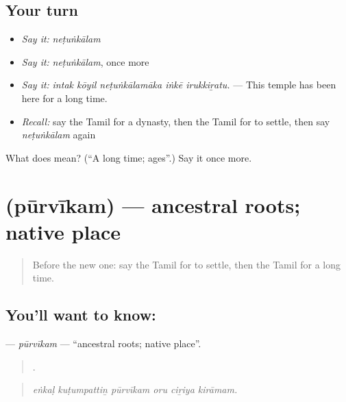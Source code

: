 \subsection*{Your turn}
\begin{itemize}
\raggedright
  \item \emph{Say it:} \emph{neṭuṅkālam}
  \item \emph{Say it:} \emph{neṭuṅkālam}, once more
  \item \emph{Say it:} \emph{intak kōyil neṭuṅkālamāka iṅkē irukkiṟatu.} — This temple has been here for a long time.
  \item \emph{Recall:} say the Tamil for a dynasty, then the Tamil for to settle, then say \emph{neṭuṅkālam} again
\end{itemize}

\begin{tcolorbox}[breakable,colback=teal!4,colframe=teal!35!black,title={Before you move on}]
What does  mean? (\textquotedblleft{}A long time; ages\textquotedblright{}.) Say it once more.
\end{tcolorbox}
\section[\texorpdfstring{\ta{பூர்வீகம்} (pūrvīkam)}{பூர்வீகம் (pūrvīkam)}]{ (pūrvīkam) — ancestral roots; native place}

\label{lesson:TA-C327-purvikam}



\begin{quote}
Before the new one: say the Tamil for to settle, then the Tamil for a long time.
\end{quote}

\subsection*{You'll want to know: }
\textbf{} — \emph{pūrvīkam} — \textquotedblleft{}ancestral roots; native place\textquotedblright{}.

\begin{quote}
     .
\end{quote}

\begin{quote}
\emph{eṅkaḷ kuṭumpattiṉ pūrvīkam oru ciṟiya kirāmam.}
\end{quote}

